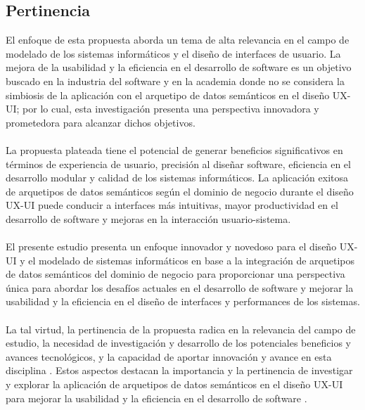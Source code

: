 \documentclass[12pt,a4paper]{article}
\begin{document}
\subsection{Pertinencia}
\label{sec:4}
El enfoque de esta propuesta aborda un tema de alta relevancia en el campo de modelado de los sistemas informáticos y el diseño de interfaces de usuario. La mejora de la usabilidad y la eficiencia en el desarrollo de software es un objetivo buscado en la industria del software y en la academia donde no se considera la simbiosis de la aplicación con el arquetipo de datos semánticos en el diseño UX-UI; por lo cual, esta investigación presenta una perspectiva innovadora y prometedora para alcanzar dichos objetivos.
\\\\
La propuesta plateada tiene el potencial de generar beneficios significativos en términos de experiencia de usuario, precisión al diseñar software, eficiencia en el desarrollo modular y calidad de los sistemas informáticos. La aplicación exitosa de arquetipos de datos semánticos según el dominio de negocio durante el diseño UX-UI puede conducir a interfaces más intuitivas, mayor productividad en el desarrollo de software y mejoras en la interacción usuario-sistema.
\\\\
El presente estudio presenta un enfoque innovador y novedoso para el diseño UX-UI y el modelado de sistemas informáticos en base a la integración de arquetipos de datos semánticos del dominio de negocio para proporcionar una perspectiva única para abordar los desafíos actuales en el desarrollo de software y mejorar la usabilidad y la eficiencia en el diseño de interfaces y performances de los sistemas.
\\\\
La tal virtud, la pertinencia de la propuesta radica en la relevancia del campo de estudio, la necesidad de investigación y desarrollo de los potenciales beneficios y avances tecnológicos, y la capacidad de aportar innovación y avance en esta disciplina
\cite{Catalina2008}
. Estos aspectos destacan la importancia y la pertinencia de investigar y explorar la aplicación de arquetipos de datos semánticos en el diseño UX-UI para mejorar la usabilidad y la eficiencia en el desarrollo de software
\cite{Qanbari2016}
.

\end{document}
